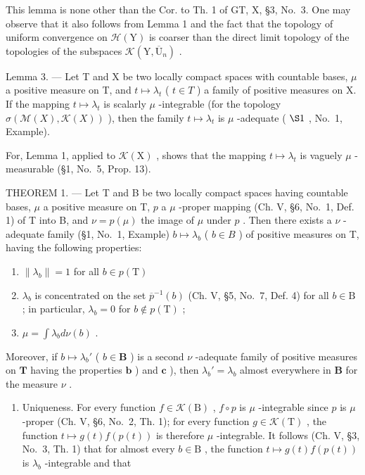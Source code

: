 This lemma is none other than the Cor. to Th. 1 of GT, X, §3, No.~3. One may observe that it also follows from Lemma 1 and the fact that the topology of uniform convergence on \(\mathcal{H}(\mathrm{Y})\) is coarser than the direct limit topology of the topologies of the subspaces \(\mathcal{K}(\mathrm{Y},\overline{\mathrm{U}}_n)\) .

Lemma 3. --- Let T and X be two locally compact spaces with countable bases, \(\mu\) a positive measure on T, and \(t \mapsto \lambda_{t}\) ( \(t \in T\) ) a family of positive measures on X. If the mapping \(t \mapsto \lambda_{t}\) is scalarly \(\mu\) -integrable (for the topology \(\sigma(\mathcal{M}(X), \mathcal{K}(X))\) ), then the family \(t \mapsto \lambda_{t}\) is \(\mu\) -adequate ( \(\S1\) , No.~1, Example).

For, Lemma 1, applied to \(\mathcal{K}(\mathrm{X})\) , shows that the mapping \(t \mapsto \lambda_t\) is vaguely \(\mu\) -measurable (§1, No.~5, Prop. 13).

THEOREM 1. --- Let T and B be two locally compact spaces having countable bases, \(\mu\) a positive measure on T, \(p\) a \(\mu\) -proper mapping (Ch. V, §6, No.~1, Def. 1) of T into B, and \(\nu = p(\mu)\) the image of \(\mu\) under \(p\) . Then there exists a \(\nu\) -adequate family (§1, No.~1, Example) \(b \mapsto \lambda_b\) ( \(b \in B\) ) of positive measures on T, having the following properties:

\begin{enumerate}
\def\labelenumi{\alph{enumi})}
\item
  \(\| \lambda_b\| = 1\) for all \(b\in p(\mathrm{T})\)
\item
  \(\lambda_{b}\) is concentrated on the set \(\overline{p}^{-1}(b)\) (Ch. V, §5, No.~7, Def. 4) for all \(b\in \mathrm{B}\) ; in particular, \(\lambda_{b} = 0\) for \(b\notin p(\mathrm{T})\) ;
\item
  \(\mu = \int \lambda_b d\nu(b)\) .
\end{enumerate}

Moreover, if \(b \mapsto \lambda_b'\) ( \(b \in \mathbf{B}\) ) is a second \(\nu\) -adequate family of positive measures on \(\mathbf{T}\) having the properties \(\mathbf{b}\) ) and \(\mathbf{c}\) ), then \(\lambda_b' = \lambda_b\) almost everywhere in \(\mathbf{B}\) for the measure \(\nu\) .

\begin{enumerate}
\def\labelenumi{\arabic{enumi})}
\tightlist
\item
  Uniqueness. For every function \(f \in \mathcal{K}(\mathrm{B})\) , \(f \circ p\) is \(\mu\) -integrable since \(p\) is \(\mu\) -proper (Ch. V, §6, No.~2, Th. 1); for every function \(g \in \mathcal{K}(\mathrm{T})\) , the function \(t \mapsto g(t)f(p(t))\) is therefore \(\mu\) -integrable. It follows (Ch. V, §3, No.~3, Th. 1) that for almost every \(b \in \mathrm{B}\) , the function \(t \mapsto g(t)f(p(t))\) is \(\lambda_b\) -integrable and that
\end{enumerate}

